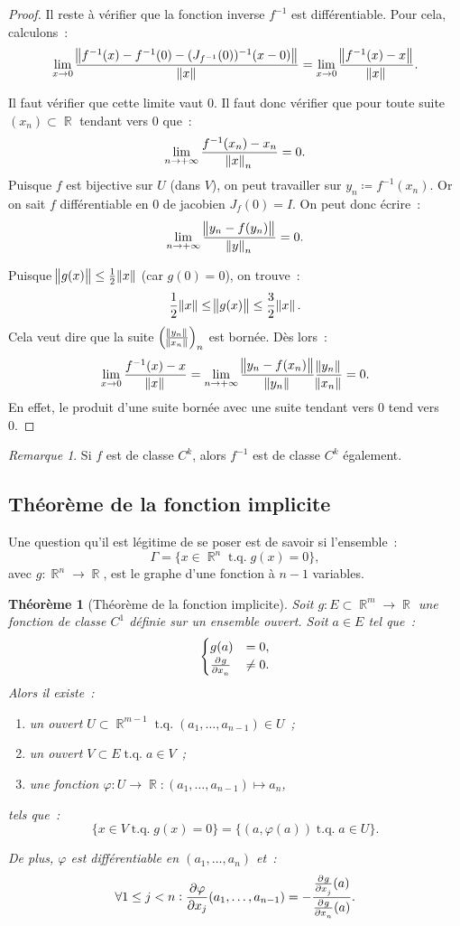 \documentclass{article}
\DeclareMathOperator{\R}{\mathbb R}
\DeclareMathOperator{\tq}{ t.q. }
\newtheorem{thm}{Théorème}[section]
\theoremstyle{definition}
\theoremstyle{remark}
\newtheorem*{rmq}{Remarque}
\begin{document}
\begin{proof}
		Il reste à vérifier que la fonction inverse $f^{-1}$ est différentiable. Pour cela, calculons~:
		\[\lim_{x \to 0}\frac {\norm{f^{-1}(x) - f^{-1}(0) - (J_{f^{-1}}(0))^{-1}(x-0)}}{\norm x} = \lim_{x \to 0}\frac {\norm {f^{-1}(x)-x}}{\norm x}.\]

		Il faut vérifier que cette limite vaut 0. Il faut donc vérifier que pour toute suite $(x_n) \subset \R$ tendant vers 0 que~:
		\[\lim_{n \to +\infty}\frac {f^{-1}(x_n) - x_n}{\norm x_n} = 0.\]
		Puisque $f$ est bijective sur $U$ (dans $V$), on peut travailler sur $y_n \coloneqq f^{-1}(x_n)$. Or on sait $f$ différentiable en 0 de jacobien
		$J_f(0) = I$. On peut donc écrire~:
		\[\lim_{n \to +\infty}\frac {\norm {y_n - f(y_n)}}{\norm y_n} = 0.\]

		Puisque $\norm {g(x)} \leq \frac 12\norm x$ (car $g(0) = 0$), on trouve~:
		\[\frac 12\norm x\leq \norm {g(x)}\leq\frac 32\norm x.\]
		Cela veut dire que la suite $\left(\frac {\norm {y_n}}{\norm {x_n}}\right)_n$ est bornée. Dès lors~:
		\[\lim_{x \to 0}\frac {f^{-1}(x) - x}{\norm x} = \lim_{n \to +\infty}\frac {\norm{y_n - f(x_n)}}{\norm {y_n}}\frac {\norm {y_n}}{\norm {x_n}} = 0.\]
		En effet, le produit d'une suite bornée avec une suite tendant vers 0 tend vers 0.
		\end{proof}

		\begin{rmq} Si $f$ est de classe $C^k$, alors $f^{-1}$ est de classe $C^k$ également.
		\end{rmq}

	\subsection{Théorème de la fonction implicite}
		Une question qu'il est légitime de se poser est de savoir si l'ensemble~:
		\[\Gamma = \{x \in \R^n \tq g(x) = 0\},\]
		avec $g : \R^n \to \R$, est le graphe d'une fonction à $n-1$ variables.

		\begin{thm}[Théorème de la fonction implicite] Soit $g : E \subset \R^m \to \R$ une fonction de classe $C^1$ définie sur un ensemble ouvert. Soit $a \in E$ tel que~:
		\[\begin{cases}g(a) &= 0, \\\pd g{x_n} &\neq 0.\end{cases}\]
		Alors il existe~:
		\begin{enumerate}
			\item un ouvert $U \subset \R^{m-1} \tq (a_1, \dotsc, a_{n-1}) \in U$~;
			\item un ouvert $V \subset E \tq a \in V$~;
			\item une fonction $\varphi : U \to \R : (a_1, \dotsc, a_{n-1}) \mapsto a_n$,
		\end{enumerate}
		tels que~:
		\[\{x \in V \tq g(x) = 0\} = \{(a, \varphi(a)) \tq a \in U\}.\]

		De plus, $\varphi$ est différentiable en $(a_1, \dotsc, a_n)$ et~:
		\[\forall 1 \leq j < n : \frac {\partial \varphi}{\partial x_j}(a_1, \dotsc, a_{n-1}) = -\frac {\pd g{x_j}(a)}{\pd g{x_n}(a)}.\]
		\end{thm}
\end{document}
